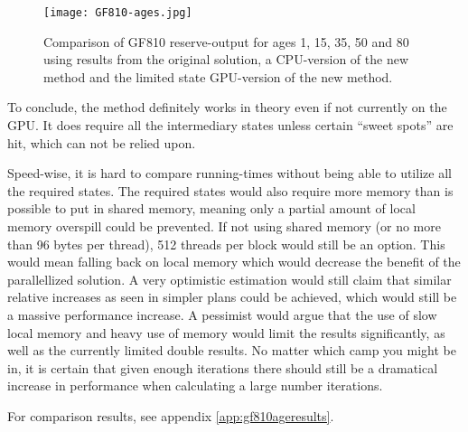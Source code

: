 \begin{figure}[h!]\centering
\texttt{[image: GF810-ages.jpg]}
\caption{Comparison of GF810 reserve-output for ages 1, 15, 35, 50 and 80 using results from the original solution, a CPU-version of the new method and the limited state GPU-version of the new method.\label{fig:gf810ages}}
\end{figure}

To conclude, the method definitely works in theory even if not currently on the GPU.
It does require all the intermediary states unless certain ``sweet spots'' are hit, which can not be relied upon.

Speed-wise, it is hard to compare running-times without being able to utilize all the required states.
The required states would also require more memory than is possible to put in shared memory, meaning only a partial amount of local memory overspill could be prevented.
If not using shared memory (or no more than 96 bytes per thread), 512 threads per block would still be an option.
This would mean falling back on local memory which would decrease the benefit of the parallellized solution.
A very optimistic estimation would still claim that similar relative increases as seen in simpler plans could be achieved, which would still be a massive performance increase.
A pessimist would argue that the use of slow local memory and heavy use of memory would limit the results significantly, as well as the currently limited double results.
No matter which camp you might be in, it is certain that given enough iterations there should still be a dramatical increase in performance when calculating a large number iterations.


For comparison results, see appendix \ref{app:gf810ageresults}.